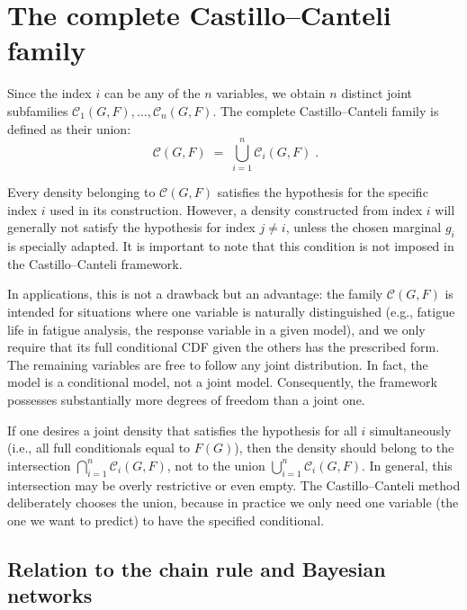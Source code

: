 \section{The complete Castillo–Canteli family}
\label{sec:cc-family}

Since the index \(i\) can be any of the \(n\) variables, we obtain \(n\) distinct joint subfamilies \(\mathcal{C}_1(G,F),\ldots,\mathcal{C}_n(G,F)\). The complete Castillo–Canteli family is defined as their union:
\[
\boxed{\;\mathcal{C}(G,F) \;=\; \bigcup_{i=1}^{n} \mathcal{C}_i(G,F)\; }.
\]

Every density belonging to \(\mathcal{C}(G,F)\) satisfies the hypothesis for the specific index \(i\) used in its construction. However, a density constructed from index \(i\) will generally not satisfy the hypothesis for index \(j\neq i\), unless the chosen marginal \(g_i\) is specially adapted. It is important to note that this condition is not imposed in the Castillo–Canteli framework.

In applications, this is not a drawback but an advantage: the family \(\mathcal{C}(G,F)\) is intended for situations where one variable is naturally distinguished (e.g., fatigue life in fatigue analysis, the response variable in a given model), and we only require that its full conditional CDF given the others has the prescribed form. The remaining variables are free to follow any joint distribution. In fact, the model is a conditional model, not a joint model. Consequently, the framework possesses substantially more degrees of freedom than a joint one.

\begin{remarkbox}
\begin{remarkT}
If one desires a joint density that satisfies the hypothesis for all \(i\) simultaneously (i.e., all full conditionals equal to \(F(G)\)), then the density should belong to the intersection \(\bigcap_{i=1}^n \mathcal{C}_i(G,F)\), not to the union \(\bigcup_{i=1}^n \mathcal{C}_i(G,F)\). In general, this intersection may be overly restrictive or even empty. The Castillo–Canteli method deliberately chooses the union, because in practice we only need one variable (the one we want to predict) to have the specified conditional.
\end{remarkT}
\end{remarkbox}

\subsection{Relation to the chain rule and Bayesian networks}

